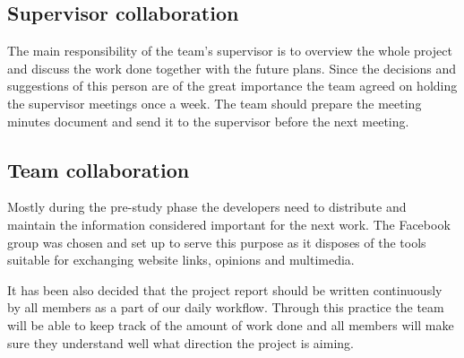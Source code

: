 \documentclass{article}
\begin{document}
\subsection{Supervisor collaboration}
The main responsibility of the team's supervisor is to overview the whole project and discuss the work done together with the future plans. Since the decisions and suggestions of this person are of the great importance the team agreed on holding the supervisor meetings once a week. The team should prepare the meeting minutes document and send it to the supervisor before the next meeting.

\subsection{Team collaboration}
Mostly during the pre-study phase the developers need to distribute and maintain the information considered important for the next work. The Facebook group was chosen and set up to serve this purpose as it disposes of the tools suitable for exchanging website links, opinions and multimedia.

It has been also decided that the project report should be written continuously by all members as a part of our daily workflow. Through this practice the team will be able to keep track of the amount of work done and all members will make sure they understand well what direction the project is aiming.
\end{document}
